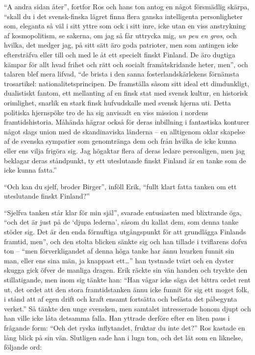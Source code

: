 ``A andra sidan åter'', fortfor Ros och hans ton antog en något
försmädlig skärpa, ``skall du i det svensk-finska lägret finna flera
ganska intelligenta personligheter som, eleganta så väl i sitt yttre som
ock i sitt inre, icke utan en viss anstrykning af kosmopolitism, se
sakerna, om jag så får uttrycka mig, \emph{un peu en gros}, och hvilka,
det medger jag, på sitt sätt äro goda patrioter, men som antingen icke
eftersträfva eller till och med le åt ett specielt finskt Finland. De
äro dugtiga kämpar för allt hvad frihet och rätt och socialt
framåtskridande heter, men'', och talaren blef mera lifvad, ``de brista
i den sanna fosterlandskärlekens förnämsta trosartikel:
nationalitetsprincipen. De framställa såsom sitt ideal ett dimdunkligt,
dualistiskt fantom, ett mellanting af en finsk stat med svensk kultur,
en historisk orimlighet, snarlik en stark finsk hufvudskalle med svensk
hjerna uti. Detta politiska hjernspöke tro de ha sig anvisadt en viss
mission i nordens framtidshistoria. Måhända hägrar också för deras
inbillning i fantastiska konturer något slags union med de skandinaviska
länderna -- en alltigenom oklar skapelse af de svenska sympatier som
genomtränga dem och från hvilka de icke kunna eller ens vilja frigöra
sig. Jag högaktar flera af deras ledare personligen, men jag beklagar
deras ståndpunkt, ty ett uteslutande finskt Finland är en tanke som de
icke kunna fatta.''

``Och kan du sjelf, broder Birger'', inföll Erik, ``fullt klart fatta
tanken om ett uteslutande finskt Finland?''

``Sjelfva tanken står klar för min själ'', svarade entusiasten med
blixtrande öga, ``och det är just på de `djupa lederna', såsom du kallat
dem, som denna tanke stöder sig. Det är den enda förnuftiga utgångspunkt
för att grundlägga Finlands framtid, men'', och den stolta blicken
sänkte sig och han tillade i tviflarens dofva ton -- ``men
förverkligandet af denna höga tanke har ännu hvarken funnit sin man,
eller ens sina män, ja knappast ett\ldots{}'' han tystnade tvärt och en
dyster skugga gick öfver de manliga dragen. Erik räckte sin vän handen
och tryckte den stillatigande, men inom sig tänkte han: ``Han vågar icke
säga det bittra ordet rent ut, det ordet att den stora framtidstanken
ännu icke funnit för sig ett moget folk, i stånd att af egen drift och
kraft ensamt fortsätta och befästa det påbegynta verket.'' Så tänkte den
unge svensken, men samtalet intresserade honom djupt och han ville icke
låta detsamma falla. Han yttrade derföre efter en liten paus i frågande
form: ``Och det ryska inflytandet, fruktar du inte det?'' Ros kastade en
lång blick på sin vän. Slutligen sade han i lugn ton, och det lät som en
liknelse, följande ord:

